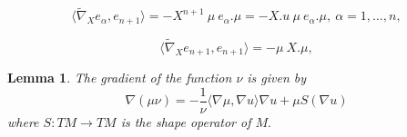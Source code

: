 \documentclass[10pt,a4paper]{amsart}
\newtheorem{lem}{Lemma}
\begin{document}
\begin{equation}\label{C1 christoffel 1}
\langle\widetilde{\nabla}_Xe_{\alpha},e_{n+1}\rangle=-X^{n+1}\ \mu\ e_\alpha.\mu=-X.u\ \mu\ e_\alpha.\mu,\ \alpha=1,\ldots,n,
\end{equation}

\begin{equation}\label{C1 christoffel 2}
\langle\widetilde{\nabla}_Xe_{n+1},e_{n+1}\rangle=-\mu\ X.\mu,
\end{equation}

\begin{lem}\label{lem nablamunu}
The gradient of the function $\nu$ is given by
\begin{equation}\label{nablamunu}
\nabla(\mu\nu)=-\frac{1}{\nu}\langle\nabla\mu,\nabla u\rangle\nabla u+\mu S(\nabla u)
\end{equation}
where $S:TM\rightarrow TM$ is the shape operator of $M.$
\end{lem}
\end{document}
